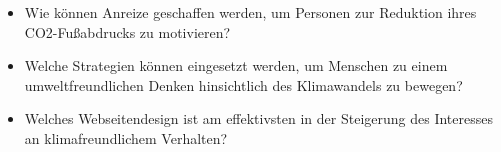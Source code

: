 \begin{itemize}

    \item Wie können Anreize geschaffen werden, um Personen zur Reduktion ihres CO2-Fußabdrucks zu motivieren?

    \item Welche Strategien können eingesetzt werden, um Menschen zu einem umweltfreundlichen Denken hinsichtlich des Klimawandels zu bewegen?

    \item Welches Webseitendesign ist am effektivsten in der Steigerung des Interesses an klimafreundlichem Verhalten?

\end{itemize}
